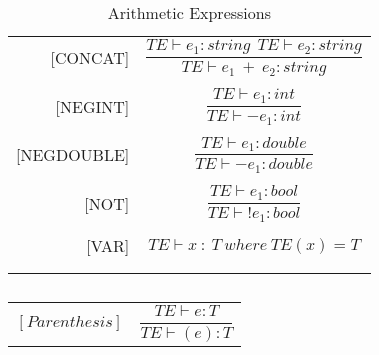 \begin{longtable}[c] { r c }
  [CONCAT] &  \(
  \dfrac{TE \vdash  e_1  :  string \ \ TE  \vdash  e_2  :  string }{TE \vdash  e_1 \ + \ e_2  :  string} \) \\
  & \\

  [NEGINT] &  \(
  \dfrac{T E  \vdash  e_1  :  int}{T E  \vdash  -e_1  :  int} \) \\
  & \\

  [NEGDOUBLE] &  \(
  \dfrac{T E  \vdash  e_1  :  double}{T E  \vdash  -e_1  :  double} \) \\
  & \\

  [NOT] &  \(
  \dfrac{T E  \vdash  e_1  :  bool}{T E  \vdash  !e_1  :  bool} \) \\
  & \\

  [VAR] & \(
  {TE \vdash x\ :\ T}\ where\ {TE(x) = T} \) \\
  & \\

  \caption{Arithmetic Expressions}
\end{longtable}

\begin{table}[H]
    \begin{center}
    \begin{longtable}[c] { r c }
        $[Parenthesis] $
        & 
        \( \dfrac{T E  \vdash  e  :  T}{T E  \vdash  (e)  :  T} \)
    \end{longtable}
    \caption{}\label{type:expr}
        \end{center}
\end{table}
 
